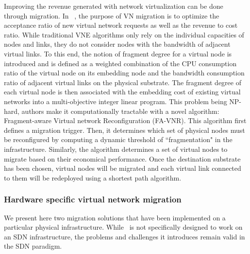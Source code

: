 Improving the revenue generated with network virtualization can be done through migration.
In ~\cite{fragment-Liu2018}, the purpose of VN migration is to optimize the acceptance ratio of new virtual network requests as well as the revenue to cost ratio.
While traditional VNE algorithms only rely on the individual capacities of nodes and links, they do not consider nodes with the bandwidth of adjacent virtual links.
To this end, the notion of fragment degree for a virtual node is introduced and is defined as a weighted combination of the CPU consumption ratio of the virtual node on its embedding node and the bandwidth consumption ratio of adjacent virtual links on the physical substrate.
The fragment degree of each virtual node is then associated with the embedding cost of existing virtual networks into a multi-objective integer linear program. This problem being NP-hard, authors make it computationally tractable with a novel algorithm: Fragment-aware Virtual network Reconfiguration (FA-VNR).
This algorithm first defines a migration trigger. 
Then, it determines which set of physical nodes must be reconfigured by computing a dynamic threshold of ``fragmentation" in the infrastructure.
Similarly, the algorithm determines a set of virtual nodes to migrate based on their economical performance.
Once the destination substrate has been chosen, virtual nodes will be migrated and each virtual link connected to them will be redeployed using a shortest path algorithm.

\subsubsection{Hardware specific virtual network migration}
We present here two migration solutions that have been implemented on a particular physical infrastructure.
While~\cite{Lo2014} is not specifically designed to work on an SDN infrastructure, the problems and challenges it introduces remain valid in the SDN paradigm.

